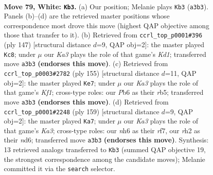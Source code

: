 \documentclass[11pt]{article}
\begin{document}
\clearpage

\begin{figure}[p]\centering
\begin{subfigure}{0.46\textwidth}\centering
\resizebox{\linewidth}{!}{%
\newchessgame
\chessboard[
  setfen={6k1/8/1P5n/P7/8/K7/7r/4R3 w - - 21 79},
  showmover=false,
  pgfstyle=straightmove, color=movearrow, markmove={a3-b3}
]}
\caption{}
\end{subfigure}\hfill
\begin{subfigure}{0.46\textwidth}\centering
\resizebox{\linewidth}{!}{%
\newchessgame
\chessboard[
  setfen={3k4/7R/8/4p1K1/4N3/8/8/5r2 b - - 6 74},
  showmover=false,
  pgfstyle=straightmove, color=movearrow, markmove={d8-c8}
]}
\caption{}
\end{subfigure}
\\[4pt]
\begin{subfigure}{0.46\textwidth}\centering
\resizebox{\linewidth}{!}{%
\newchessgame
\chessboard[
  setfen={5k2/8/8/1R5K/8/p5N1/8/r7 b - - 6 78},
  showmover=false,
  pgfstyle=straightmove, color=movearrow, markmove={f8-e7}
]}
\caption{}
\end{subfigure}\hfill
\begin{subfigure}{0.46\textwidth}\centering
\resizebox{\linewidth}{!}{%
\newchessgame
\chessboard[
  setfen={8/3K1R2/k2N4/8/1p6/6r1/8/8 b - - 18 80},
  showmover=false,
  pgfstyle=straightmove, color=movearrow, markmove={a6-a7}
]}
\caption{}
\end{subfigure}
\caption{\textbf{Move 79, White: \texttt{Kb3}.} (a) Our position; Melanie plays \texttt{Kb3} (\texttt{a3b3}). Panels (b)--(d) are the retrieved master positions whose correspondence most drove this move (highest QAP objective among those that transfer to it). (b) Retrieved from \texttt{ccrl\_top\_p0001\#396} (ply 147) [structural distance $d$=9, QAP obj=2]: the master played \texttt{Kc8}; under $\mu$ our \emph{Ka3} plays the role of that game's \emph{Kd1}; transferred move \texttt{a3b3} \textbf{(endorses this move)}. (c) Retrieved from \texttt{ccrl\_top\_p0003\#2782} (ply 155) [structural distance $d$=11, QAP obj=2]: the master played \texttt{Ke7}; under $\mu$ our \emph{Ka3} plays the role of that game's \emph{Kf1}; cross-type roles: our \emph{P}b6 as their \emph{r}b5; transferred move \texttt{a3b3} \textbf{(endorses this move)}. (d) Retrieved from \texttt{ccrl\_top\_p0001\#2248} (ply 159) [structural distance $d$=9, QAP obj=2]: the master played \texttt{Ka7}; under $\mu$ our \emph{Ka3} plays the role of that game's \emph{Ka3}; cross-type roles: our \emph{n}h6 as their \emph{r}f7, our \emph{r}h2 as their \emph{n}d6; transferred move \texttt{a3b3} \textbf{(endorses this move)}. Synthesis: 13 retrieved analogs transferred to \texttt{Kb3} (summed QAP objective 19, the strongest correspondence among the candidate moves); Melanie committed it via the \texttt{search} selector.}
\label{fig:thought-m156}
\end{figure}
\end{document}
